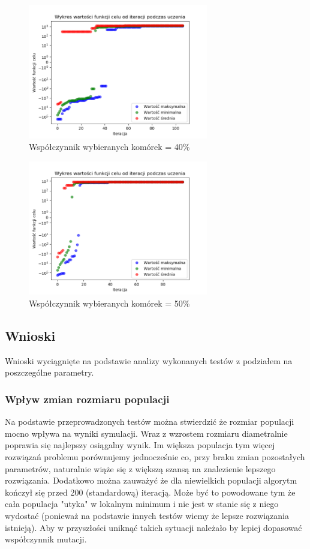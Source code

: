 \documentclass[a4paper]{article}
\begin{document}
\begin{figure}[H]
    \centering
    \includegraphics[width=0.7\textwidth]{plots/selection_40.png}
    \caption{Współczynnik wybieranych komórek = 40\%}
    \label{fig:selection_40}
\end{figure}

\begin{figure}[H]
    \centering
    \includegraphics[width=0.7\textwidth]{plots/selection_50.png}
    \caption{Współczynnik wybieranych komórek = 50\%}
    \label{fig:selection_50}
\end{figure}


\subsection{Wnioski}
Wnioski wyciągnięte na podstawie analizy wykonanych testów z podziałem na poszczególne parametry.
\subsubsection{Wpływ zmian rozmiaru populacji}
Na podstawie przeprowadzonych testów można stwierdzić że rozmiar populacji mocno wpływa na wyniki symulacji. Wraz z wzrostem rozmiaru diametralnie poprawia się najlepszy osiągalny wynik. Im większa populacja tym więcej rozwiązań problemu porównujemy jednocześnie co, przy braku zmian pozostałych parametrów, naturalnie wiąże się z większą szansą na znalezienie lepszego rozwiązania. Dodatkowo można zauważyć że dla niewielkich populacji algorytm kończył się przed 200 (standardową) iteracją. Może być to powodowane tym że cała populacja "utyka" w lokalnym minimum i nie jest w stanie się z niego wydostać (ponieważ na podstawie innych testów wiemy że lepsze rozwiązania istnieją). Aby w przyszłości uniknąć takich sytuacji należało by lepiej dopasować współczynnik mutacji.
\end{document}
